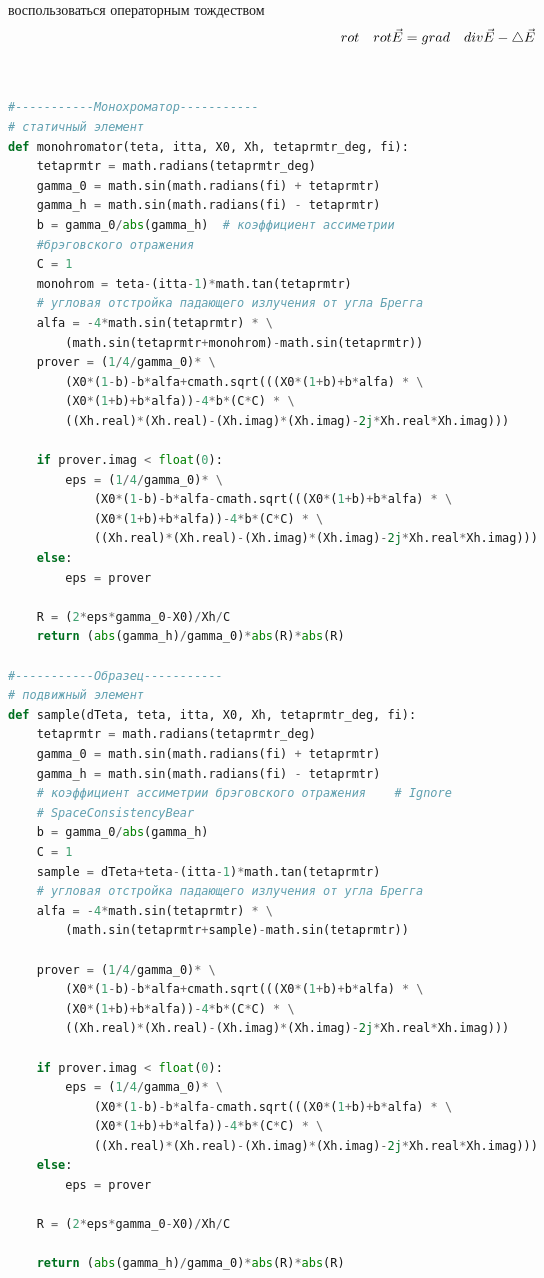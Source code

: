   воспользоваться операторным тождеством
 \begin{equation}
   rot \quad rot \vec{E} = grad \quad div \vec{E} - \mathop{}\!\mathbin\bigtriangleup \vec{E}
  \end{equation}

\newpage
  \begin{center}
  \section{ }%
  \label{sec:sample_functions}
  \end{center}
{\scriptsize
\begin{lstlisting}[language=Python]

#-----------Монохроматор-----------
# статичный элемент
def monohromator(teta, itta, X0, Xh, tetaprmtr_deg, fi):
    tetaprmtr = math.radians(tetaprmtr_deg)
    gamma_0 = math.sin(math.radians(fi) + tetaprmtr)
    gamma_h = math.sin(math.radians(fi) - tetaprmtr)
    b = gamma_0/abs(gamma_h)  # коэффициент ассиметрии
    #брэговского отражения
    C = 1
    monohrom = teta-(itta-1)*math.tan(tetaprmtr)
    # угловая отстройка падающего излучения от угла Брегга
    alfa = -4*math.sin(tetaprmtr) * \
        (math.sin(tetaprmtr+monohrom)-math.sin(tetaprmtr))
    prover = (1/4/gamma_0)* \
        (X0*(1-b)-b*alfa+cmath.sqrt(((X0*(1+b)+b*alfa) * \
        (X0*(1+b)+b*alfa))-4*b*(C*C) * \
        ((Xh.real)*(Xh.real)-(Xh.imag)*(Xh.imag)-2j*Xh.real*Xh.imag)))

    if prover.imag < float(0):
        eps = (1/4/gamma_0)* \
            (X0*(1-b)-b*alfa-cmath.sqrt(((X0*(1+b)+b*alfa) * \
            (X0*(1+b)+b*alfa))-4*b*(C*C) * \
            ((Xh.real)*(Xh.real)-(Xh.imag)*(Xh.imag)-2j*Xh.real*Xh.imag)))
    else:
        eps = prover

    R = (2*eps*gamma_0-X0)/Xh/C
    return (abs(gamma_h)/gamma_0)*abs(R)*abs(R)

#-----------Образец-----------
# подвижный элемент
def sample(dTeta, teta, itta, X0, Xh, tetaprmtr_deg, fi):
    tetaprmtr = math.radians(tetaprmtr_deg)
    gamma_0 = math.sin(math.radians(fi) + tetaprmtr)
    gamma_h = math.sin(math.radians(fi) - tetaprmtr)
    # коэффициент ассиметрии брэговского отражения    # Ignore
    # SpaceConsistencyBear
    b = gamma_0/abs(gamma_h)
    C = 1
    sample = dTeta+teta-(itta-1)*math.tan(tetaprmtr)
    # угловая отстройка падающего излучения от угла Брегга
    alfa = -4*math.sin(tetaprmtr) * \
        (math.sin(tetaprmtr+sample)-math.sin(tetaprmtr))

    prover = (1/4/gamma_0)* \
        (X0*(1-b)-b*alfa+cmath.sqrt(((X0*(1+b)+b*alfa) * \
        (X0*(1+b)+b*alfa))-4*b*(C*C) * \
        ((Xh.real)*(Xh.real)-(Xh.imag)*(Xh.imag)-2j*Xh.real*Xh.imag)))

    if prover.imag < float(0):
        eps = (1/4/gamma_0)* \
            (X0*(1-b)-b*alfa-cmath.sqrt(((X0*(1+b)+b*alfa) * \
            (X0*(1+b)+b*alfa))-4*b*(C*C) * \
            ((Xh.real)*(Xh.real)-(Xh.imag)*(Xh.imag)-2j*Xh.real*Xh.imag)))
    else:
        eps = prover

    R = (2*eps*gamma_0-X0)/Xh/C

    return (abs(gamma_h)/gamma_0)*abs(R)*abs(R)


\end{lstlisting}
}
